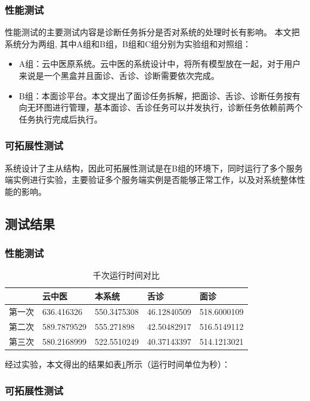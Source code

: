 \subsubsection{性能测试}
性能测试的主要测试内容是诊断任务拆分是否对系统的处理时长有影响。
本文把系统分为两组, 其中A组和B组，B组和C组分别为实验组和对照组：
\begin{itemize}
    \item A组：云中医原系统。云中医的系统设计中，将所有模型放在一起，对于用户来说是一个黑盒并且面诊、舌诊、诊断需要依次完成。
    \item B组：本面诊平台。本文提出了面诊任务拆解，把面诊、舌诊、诊断任务按有向无环图进行管理，基本面诊、舌诊任务可以并发执行，诊断任务依赖前两个任务执行完成后执行。
\end{itemize}

\subsubsection{可拓展性测试}
系统设计了主从结构，因此可拓展性测试是在B组的环境下，同时运行了多个服务端实例进行实验，主要验证多个服务端实例是否能够正常工作，以及对系统整体性能的影响。


\subsection{测试结果}

\subsubsection{性能测试}


\begin{table}[h!]
    \centering
    \caption{千次运行时间对比}
    \begin{tabular}{l|l|l|l|l}
        &云中医&本系统&舌诊&面诊 \\
        \hline
        第一次&636.416326&550.3475308&46.12840509&518.6000109 \\
        第二次&589.7879529&555.271898&42.50482917&516.5149112 \\
        第三次&580.2168999&522.5510249&40.37143397&514.1213021 \\
    \end{tabular}
    \label{tab:runtime}
\end{table}

经过实验，本文得出的结果如表\ref{tab:runtime}所示（运行时间单位为秒）：

\subsubsection{可拓展性测试}

